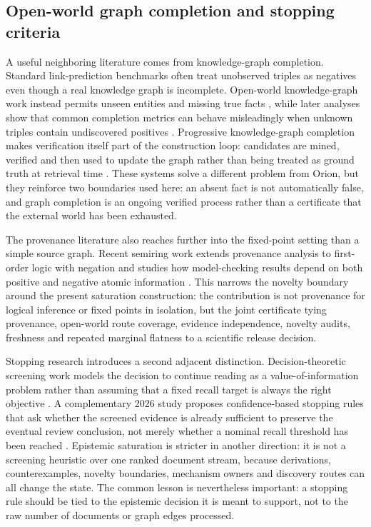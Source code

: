 \subsection{Open-world graph completion and stopping criteria}

A useful neighboring literature comes from knowledge-graph completion. Standard link-prediction benchmarks often treat unobserved triples as negatives even though a real knowledge graph is incomplete. Open-world knowledge-graph work instead permits unseen entities and missing true facts \cite{shi2017}, while later analyses show that common completion metrics can behave misleadingly when unknown triples contain undiscovered positives \cite{yang2022}. Progressive knowledge-graph completion makes verification itself part of the construction loop: candidates are mined, verified and then used to update the graph rather than being treated as ground truth at retrieval time \cite{li2024kg}. These systems solve a different problem from Orion, but they reinforce two boundaries used here: an absent fact is not automatically false, and graph completion is an ongoing verified process rather than a certificate that the external world has been exhausted.

The provenance literature also reaches further into the fixed-point setting than a simple source graph. Recent semiring work extends provenance analysis to first-order logic with negation and studies how model-checking results depend on both positive and negative atomic information \cite{gradel2024}. This narrows the novelty boundary around the present saturation construction: the contribution is not provenance for logical inference or fixed points in isolation, but the joint certificate tying provenance, open-world route coverage, evidence independence, novelty audits, freshness and repeated marginal flatness to a scientific release decision.

Stopping research introduces a second adjacent distinction. Decision-theoretic screening work models the decision to continue reading as a value-of-information problem rather than assuming that a fixed recall target is always the right objective \cite{fletcher2026}. A complementary 2026 study proposes confidence-based stopping rules that ask whether the screened evidence is already sufficient to preserve the eventual review conclusion, not merely whether a nominal recall threshold has been reached \cite{fletcher2026b}. Epistemic saturation is stricter in another direction: it is not a screening heuristic over one ranked document stream, because derivations, counterexamples, novelty boundaries, mechanism owners and discovery routes can all change the state. The common lesson is nevertheless important: a stopping rule should be tied to the epistemic decision it is meant to support, not to the raw number of documents or graph edges processed.

